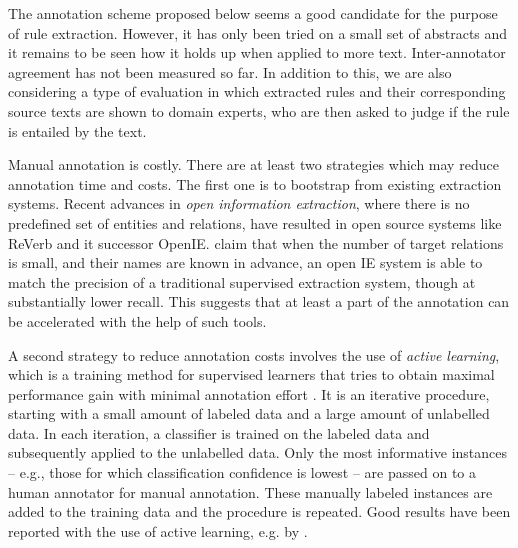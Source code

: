 \documentclass[10pt, a4paper]{article}
\begin{document}
The annotation scheme proposed below seems a good candidate for the purpose of rule extraction.
However, it has only been tried on a small set of abstracts and it remains to be seen how it holds up when applied to more text.
Inter-annotator agreement has not been measured so far.
In addition to this, we are also considering a type of evaluation in which extracted rules and their corresponding source texts are shown to domain experts, who are then asked to judge if the rule is entailed by the text. 

Manual annotation is costly. There are at least two strategies which may reduce annotation time and costs. 
The first one is to bootstrap from existing extraction systems.
Recent advances in \emph{open information extraction}, where there is no predefined set of entities and relations, have resulted in open source systems like ReVerb \cite{Fader2011Identifying} and it successor OpenIE.
 claim that when the number of target relations is small, and their
names are known in advance, an open IE system is able to match the precision of a traditional
supervised extraction system, though at substantially lower recall.
This suggests that at least a part of the annotation can be accelerated with the help of such tools.

A second strategy to reduce annotation costs involves the use of \emph{active learning}, which is a training method for supervised learners that tries to obtain maximal performance gain with minimal annotation effort \cite{Olsson09}.
It is an iterative procedure, starting with a small amount of labeled data and a large amount of unlabelled data.
In each iteration, a classifier is trained on the labeled data and subsequently applied to the unlabelled data.
Only the most informative instances -- e.g., those for which classification confidence is lowest -- are passed on to a human annotator for manual annotation.
These manually labeled instances are added to the training data and the procedure is repeated.
Good results have been reported with the use of active learning, e.g. by \cite{gamback2011active}.
\end{document}

